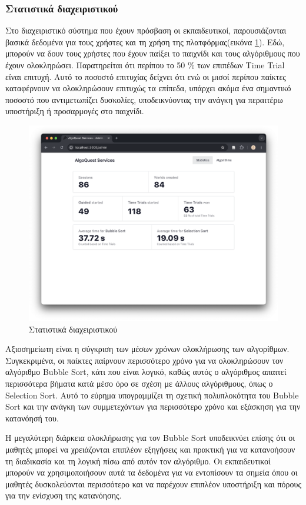 \subsubsection{Στατιστικά διαχειριστικού}

Στο διαχειριστικό σύστημα που έχουν πρόσβαση οι εκπαιδευτικοί, παρουσιάζονται βασικά δεδομένα για τους χρήστες και τη χρήση της πλατφόρμας(εικόνα \ref{fig:admin_dashboard_statistics_results}). Εδώ, μπορούν να δουν τους χρήστες που έχουν παίξει το παιχνίδι και τους αλγόριθμους που έχουν ολοκληρώσει. Παρατηρείται ότι περίπου το 50 \% των επιπέδων Time Trial είναι επιτυχή. Αυτό το ποσοστό επιτυχίας δείχνει ότι ενώ οι μισοί περίπου παίκτες καταφέρνουν να ολοκληρώσουν επιτυχώς τα επίπεδα, υπάρχει ακόμα ένα σημαντικό ποσοστό που αντιμετωπίζει δυσκολίες, υποδεικνύοντας την ανάγκη για περαιτέρω υποστήριξη ή προσαρμογές στο παιχνίδι.

\begin{figure}[H]
    \centering
    \includegraphics[width=0.7\linewidth]{sections/5/2/images/admin_dashboard_statistics}
    \caption{Στατιστικά διαχειριστικού}
    \label{fig:admin_dashboard_statistics_results}
\end{figure}

Αξιοσημείωτη είναι η σύγκριση των μέσων χρόνων ολοκλήρωσης των αλγορίθμων. Συγκεκριμένα, οι παίκτες παίρνουν περισσότερο χρόνο για να ολοκληρώσουν τον αλγόριθμο Bubble Sort, κάτι που είναι λογικό, καθώς αυτός ο αλγόριθμος απαιτεί περισσότερα βήματα κατά μέσο όρο σε σχέση με άλλους αλγόριθμους, όπως ο Selection Sort. Αυτό το εύρημα υπογραμμίζει τη σχετική πολυπλοκότητα του Bubble Sort και την ανάγκη των συμμετεχόντων  για περισσότερο χρόνο και εξάσκηση για την κατανόησή του.

Η μεγαλύτερη διάρκεια ολοκλήρωσης για τον Bubble Sort υποδεικνύει επίσης ότι οι μαθητές μπορεί να χρειάζονται επιπλέον εξηγήσεις και πρακτική για να κατανοήσουν τη διαδικασία και τη λογική πίσω από αυτόν τον αλγόριθμο. Οι εκπαιδευτικοί μπορούν να χρησιμοποιήσουν αυτά τα δεδομένα για να εντοπίσουν τα σημεία όπου οι μαθητές δυσκολεύονται περισσότερο και να παρέχουν επιπλέον υποστήριξη και πόρους για την ενίσχυση της κατανόησης.

